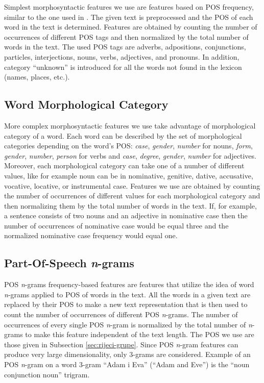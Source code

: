 \documentclass{llncs}
\begin{document}
Simplest morphosyntactic features we use are features based on POS frequency,
similar to the one used in \cite{kukushkina2001using}. The given text is
preprocessed and the POS of each word in the text is determined. Features are
obtained by counting the number of occurrences of different POS tags and then
normalized by the total number of words in the text. The used POS tags are
adverbs, adpositions, conjunctions, particles, interjections, nouns, verbs,
adjectives, and pronouns. In addition, category ``unknown'' is introduced for all
the words not found in the lexicon (names, places, etc.).


\subsection{Word Morphological Category}
\label{sec:morphosyntactic}

More complex morphosyntactic features we use take advantage of morphological
category of a word. Each word can be described by the set of morphological
categories depending on the word's POS: \emph{case}, \emph{gender}, \emph{number}
for nouns, \emph{form}, \emph{gender}, \emph{number}, \emph{person} for verbs and
\emph{case}, \emph{degree}, \emph{gender}, \emph{number} for adjectives.
Moreover, each morphological category can take one of a number of different
values, like for example noun can be in nominative, genitive, dative, accusative, vocative,
locative, or instrumental case. Features we use are obtained by counting the
number of occurrences of different values for each morphological category and
then normalizing them by the total number of words in the text. If, for example,
a sentence consists of two nouns and an adjective in nominative case then the
number of occurrences of nominative case would be equal three and the normalized
nominative case frequency would equal one.

\subsection{Part-Of-Speech \emph{n}-grams}
\label{sec:ngrami-tipova}
POS \emph{n}-grams frequency-based features are features that utilize the idea of
word \emph{n}-grams applied to POS of words in the text. All the words in a given
text are replaced by their POS to make a new text representation that is then
used to count the number of occurrences of different POS \emph{n}-grams. The
number of occurrences of every single POS \emph{n}-gram is normalized by the
total number of \emph{n}-grams to make this feature independent of the text
length. The POS we use are those given in Subsection \ref{sec:rijeci-grupe}.
Since POS \emph{n}-gram features can produce very large dimensionality, only
3-grams are considered. Example of an POS \emph{n}-gram on a word 3-gram ``Adam i
Eva'' (``Adam and Eve'') is the ``noun conjunction noun'' trigram.
\end{document}

